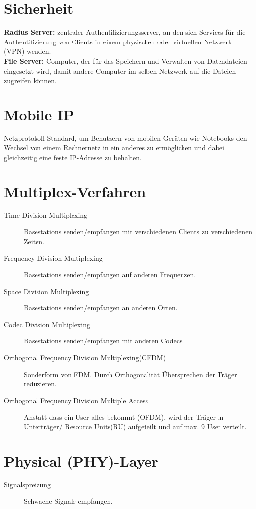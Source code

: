 \documentclass[12pt,a4paper]{article}
\begin{document}
\section{Sicherheit}
	\textbf{Radius Server:} zentraler Authentifizierungsserver, an den sich Services für die Authentifizierung von Clients in einem physischen oder virtuellen Netzwerk (VPN) wenden.\\
	\textbf{File Server:}  Computer, der für das Speichern und Verwalten von Datendateien eingesetzt wird, damit andere Computer im selben Netzwerk auf die Dateien zugreifen können.

\section{Mobile IP}
Netzprotokoll-Standard, um Benutzern von mobilen Geräten wie Notebooks den Wechsel von einem Rechnernetz in ein anderes zu ermöglichen und dabei gleichzeitig eine feste IP-Adresse zu behalten.

\section{Multiplex-Verfahren}
	\begin{description}
		\item[Time Division Multiplexing] Basestations senden/empfangen mit verschiedenen Clients zu verschiedenen Zeiten.
		\item[Frequency Division Multiplexing] Basestations senden/empfangen auf anderen Frequenzen.
		\item[Space Division Multiplexing] Basestations senden/empfangen an anderen Orten.
		\item[Codec Division Multiplexing] Basestations senden/empfangen mit anderen Codecs.
		\item[Orthogonal Frequency Division Multiplexing(OFDM)] Sonderform von FDM. Durch Orthogonalität Übersprechen der Träger reduzieren.
		\item[Orthogonal Frequency Division Multiple Access] Anstatt dass ein User alles bekommt (OFDM), wird der Träger in Unterträger/ Resource Units(RU) aufgeteilt und auf max. 9 User verteilt.  
	\end{description}

\section{Physical (PHY)-Layer}
	\begin{description}
		\item[Signalspreizung] Schwache Signale empfangen.
	\end{description}
\end{document}
